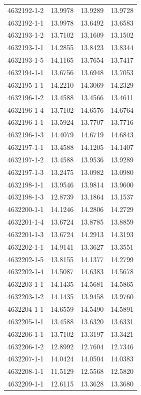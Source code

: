 \begin{longtable}{lrrr}
4632192-1-2 & 13.9978 & 13.9289 & 13.9728 \\
4632192-1-1 & 13.9978 & 13.6492 & 13.6583 \\
4632193-1-2 & 13.7102 & 13.1609 & 13.1502 \\
4632193-1-1 & 14.2855 & 13.8423 & 13.8344 \\
4632193-1-5 & 14.1165 & 13.7654 & 13.7417 \\
4632194-1-1 & 13.6756 & 13.6948 & 13.7053 \\
4632195-1-1 & 14.2210 & 14.3069 & 14.2329 \\
4632196-1-2 & 13.4588 & 13.4566 & 13.4611 \\
4632196-1-4 & 13.7102 & 14.6576 & 14.6764 \\
4632196-1-1 & 13.5924 & 13.7707 & 13.7716 \\
4632196-1-3 & 14.4079 & 14.6719 & 14.6843 \\
4632197-1-1 & 13.4588 & 14.1205 & 14.1407 \\
4632197-1-2 & 13.4588 & 13.9536 & 13.9289 \\
4632197-1-3 & 13.2475 & 13.0982 & 13.0980 \\
4632198-1-1 & 13.9546 & 13.9814 & 13.9600 \\
4632198-1-3 & 12.8739 & 13.1864 & 13.1537 \\
4632200-1-1 & 14.1246 & 14.2806 & 14.2729 \\
4632201-1-4 & 13.6724 & 13.8785 & 13.8859 \\
4632201-1-3 & 13.6724 & 14.2913 & 14.3193 \\
4632202-1-1 & 14.9141 & 13.3627 & 13.3551 \\
4632202-1-5 & 13.8155 & 14.1377 & 14.2799 \\
4632202-1-4 & 14.5087 & 14.6383 & 14.5678 \\
4632203-1-1 & 14.1435 & 14.5681 & 14.5865 \\
4632203-1-2 & 14.1435 & 13.9458 & 13.9760 \\
4632204-1-1 & 14.6559 & 14.5490 & 14.5891 \\
4632205-1-1 & 13.4588 & 13.6320 & 13.6331 \\
4632206-1-1 & 13.7102 & 13.3197 & 13.3421 \\
4632206-1-2 & 12.8992 & 12.7604 & 12.7346 \\
4632207-1-1 & 14.0424 & 14.0504 & 14.0383 \\
4632208-1-1 & 11.5129 & 12.5568 & 12.5820 \\
4632209-1-1 & 12.6115 & 13.3628 & 13.3680 \\

\end{longtable}
